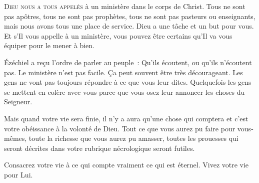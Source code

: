 

\lettrine{D}{ieu nous a tous appelés} à un ministère
 dans le corps de Christ. Tous ne sont pas apôtres,
 tous ne sont pas prophètes, tous ne sont pas pasteurs ou enseignants,
 mais nous avons tous une place de service.
 Dieu a une tâche et un but pour vous.
 Et s'Il vous appelle à un ministère, vous pouvez être certains
 qu'Il va vous équiper pour le mener à bien. 


Ézéchiel a reçu l'ordre de parler au peuple~: 
 \og Qu'ils écoutent, ou qu'ils n'écoutent pas. \fg{}
 Le ministère n'est pas facile. Ça peut souvent être très décourageant.
 Les gens ne vont pas toujours répondre à ce que vous leur dites.
 Quelquefois les gens se mettent en colère avec vous parce que vous osez
 leur annoncer les choses du Seigneur. 

Mais quand votre vie sera finie, il n'y a aura qu'une chose qui comptera 
 \ocadr et c'est votre obéissance à la volonté de Dieu.
 Tout ce que vous aurez pu faire pour vous-mêmes, toute la richesse
 que vous aurez pu amasser, toutes les prouesses qui seront décrites
 dans votre rubrique nécrologique seront futiles. 

Consacrez votre vie à ce qui compte vraiment
 \ocadr ce qui est éternel. Vivez votre vie pour Lui. 

\dvrule






